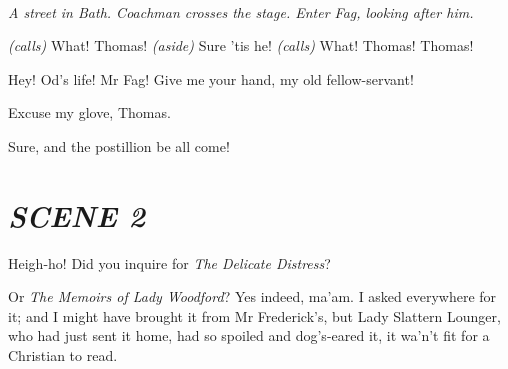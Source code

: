 \documentclass[11pt,a4paper,oneside]{memoir}  %
\begin{document}
  \begin{description}[itemsep=1ex,leftmargin=1cm]
    
    \item[] \hfill \\
    \textit{A street in Bath.  Coachman crosses the stage. Enter Fag, looking after him.}
    
    
    \item[FAG] \textit{(calls)} What!  Thomas! \textit{(aside)} Sure 'tis he! \textit{(calls)} What!  Thomas!  Thomas!
    
    \item[THOMAS] Hey!  Od's life!  Mr Fag!  Give me your hand, my old fellow-servant!
    
    \item[FAG] Excuse my glove, Thomas.
    
    \item[THOMAS] Sure, and the postillion be all come!
    
  \end{description}
  \vskip 1cm  %
  
  \section*{\textit{SCENE 2}}
  \begin{description}[itemsep=1ex,leftmargin=1cm]
    
    \item[] \hfill
    
    \item[LYDIA] Heigh-ho!  Did you inquire for \textit{The Delicate Distress}?
    
    \item[LUCY] Or \textit{The Memoirs of Lady Woodford}? Yes indeed, ma'am.  I asked everywhere for it; and I might have brought it from Mr Frederick's, but Lady Slattern Lounger, who had just sent it home, had so spoiled and dog's-eared it, it wa'n't fit for a Christian to read.
    
  \end{description}
  \vskip 1cm
  
\end{document}
